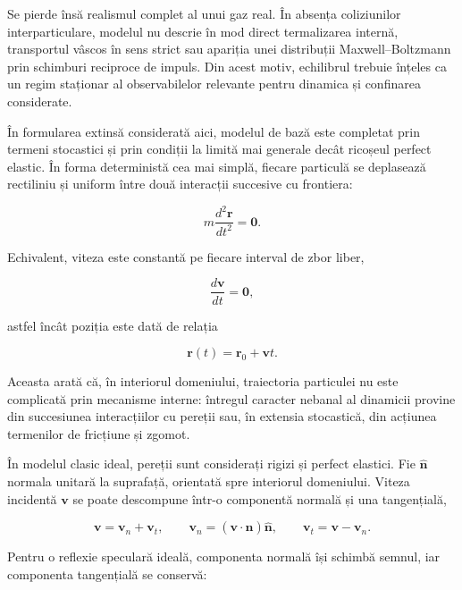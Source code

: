 \documentclass[12pt,openright,twoside]{book}
\begin{document}
Se pierde însă realismul complet al unui gaz real. În absența coliziunilor interparticulare, modelul nu descrie în mod direct termalizarea internă, transportul vâscos în sens strict sau apariția unei distribuții Maxwell--Boltzmann prin schimburi reciproce de impuls. Din acest motiv, echilibrul trebuie înțeles ca un regim staționar al observabilelor relevante pentru dinamica și confinarea considerate.

În formularea extinsă considerată aici, modelul de bază este completat prin termeni stocastici și prin condiții la limită mai generale decât ricoșeul perfect elastic. În forma deterministă cea mai simplă, fiecare particulă se deplasează rectiliniu și uniform între două interacții succesive cu frontiera:

\begin{equation}
    m\frac{d^2\mathbf{r}}{dt^2}=\mathbf{0}.
\end{equation}

Echivalent, viteza este constantă pe fiecare interval de zbor liber,

\begin{equation}
    \frac{d\mathbf{v}}{dt}=\mathbf{0},
\end{equation}

astfel încât poziția este dată de relația

\begin{equation}
    \mathbf{r}(t)=\mathbf{r}_0+\mathbf{v}t.
\end{equation}

Aceasta arată că, în interiorul domeniului, traiectoria particulei nu este complicată prin mecanisme interne: întregul caracter nebanal al dinamicii provine din succesiunea interacțiilor cu pereții sau, în extensia stocastică, din acțiunea termenilor de fricțiune și zgomot.

În modelul clasic ideal, pereții sunt considerați rigizi și perfect elastici. Fie $\hat{\mathbf{n}}$ normala unitară la suprafață, orientată spre interiorul domeniului. Viteza incidentă $\mathbf{v}$ se poate descompune într-o componentă normală și una tangențială,

\begin{equation}
    \mathbf{v}=\mathbf{v}_n+\mathbf{v}_t, \qquad
    \mathbf{v}_n=(\mathbf{v}\cdot\hat{\mathbf{n}})\hat{\mathbf{n}},
    \qquad
    \mathbf{v}_t=\mathbf{v}-\mathbf{v}_n.
\end{equation}

Pentru o reflexie speculară ideală, componenta normală își schimbă semnul, iar componenta tangențială se conservă:
\end{document}
